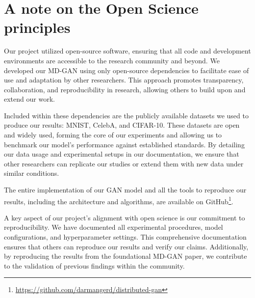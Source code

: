 \chapter{A note on the Open Science principles}
Our project utilized open-source software, ensuring that all code and development environments are accessible to the research community and beyond. We developed our MD-GAN using only open-source dependencies to facilitate ease of use and adaptation by other researchers. This approach promotes transparency, collaboration, and reproducibility in research, allowing others to build upon and extend our work.

Included within these dependencies are the publicly available datasets we used to produce our results: MNIST, CelebA, and CIFAR-10. These datasets are open and widely used, forming the core of our experiments and allowing us to benchmark our model's performance against established standards. By detailing our data usage and experimental setups in our documentation, we ensure that other researchers can replicate our studies or extend them with new data under similar conditions.

The entire implementation of our GAN model and all the tools to reproduce our results, including the architecture and algorithms, are available on GitHub\footnote{\url{https://github.com/darmangerd/distributed-gan}}.

A key aspect of our project's alignment with open science is our commitment to reproducibility. We have documented all experimental procedures, model configurations, and hyperparameter settings. This comprehensive documentation ensures that others can reproduce our results and verify our claims. Additionally, by reproducing the results from the foundational MD-GAN paper, we contribute to the validation of previous findings within the community.